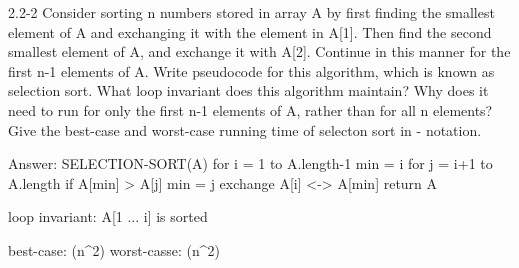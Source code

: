 2.2-2
Consider sorting n numbers stored in array A by first finding the smallest element of A and exchanging it with the element in A[1]. Then find the second  smallest element of A, and exchange it with A[2]. Continue in this manner for the first n-1 elements of A. Write pseudocode for this algorithm, which is known as selection sort. What loop invariant does this algorithm maintain? Why does it need  to run for only the first n-1 elements of A, rather than for all n elements? Give the best-case and worst-case running time of selecton sort in \Theta - notation.

Answer:
SELECTION-SORT(A)
  for i = 1 to A.length-1
    min = i
    for j = i+1 to A.length
      if A[min] > A[j]
        min = j
    exchange A[i] <-> A[min]
  return A
  
loop invariant: A[1 ... i] is sorted
  
best-case: \Theta(n^2)
worst-casse: \Theta(n^2)

  
